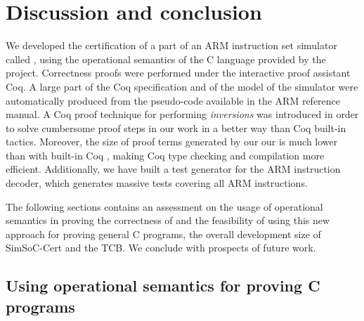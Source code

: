 \chapter{Discussion and conclusion}
\label{cpt:concl}


We developed the certification of a part of
an ARM instruction set simulator called \simlight,
using
the operational semantics of the C language provided by the \compcert project.
Correctness proofs were performed under the interactive proof assistant
Coq.
A large part of the Coq specification and of the model of the simulator
were automatically produced from the pseudo-code available in the ARM reference manual.
A Coq proof technique for performing \emph{inversions} was introduced in
order to solve cumbersome proof steps in our work
in a better way than Coq built-in tactics.
Moreover, the size of proof terms generated by our our \hcinv
is much lower than with built-in Coq \inversion,
making Coq type checking and compilation more efficient.
Additionally, we have built a test generator for the ARM instruction decoder,
which generates massive tests covering all ARM instructions.

The following sections contains
an assessment on the usage of operational semantics
in proving the correctness of \simlight and the feasibility of
using this new approach for proving general C programs,
the overall development size of SimSoC-Cert and the TCB.
We conclude with prospects of future work.

\section{Using operational semantics for proving C programs}

